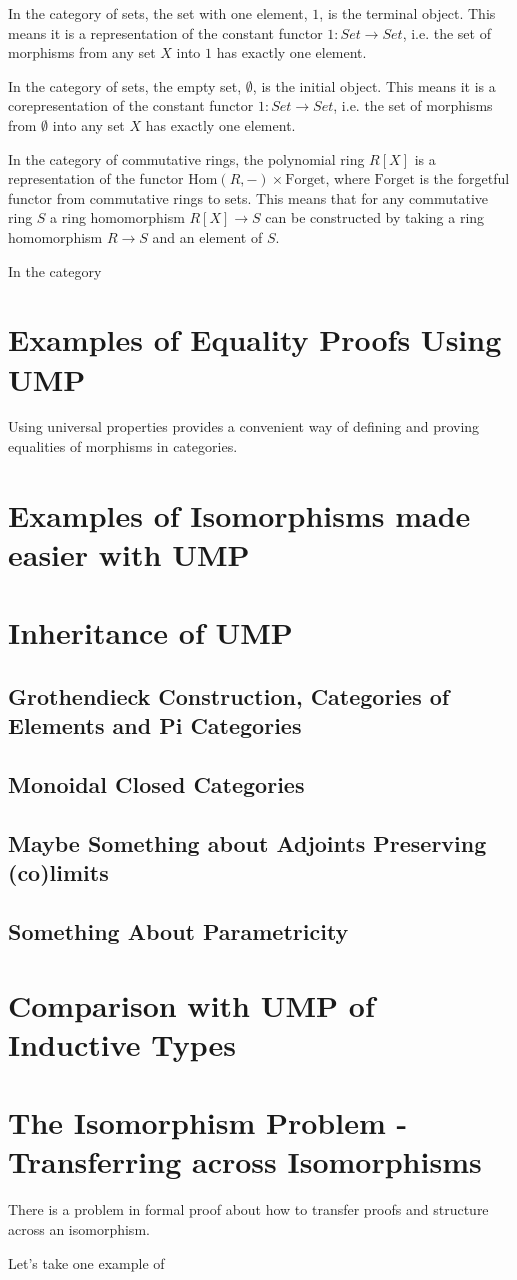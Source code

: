 \documentclass[12pt]{article} %
\theoremstyle{definition}
\theoremstyle{definition}
\theoremstyle{definition}
\theoremstyle{definition}
\begin{document}
In the category of sets, the set with one element, $1$, is the terminal object. This means it is a representation
of the constant functor $1 : Set \to Set$, i.e. the set of morphisms from any set $X$ into $1$ has exactly
one element.

In the category of sets, the empty set, $\emptyset$, is the initial object. This means it is a corepresentation
of the constant functor $1 : Set \to Set$, i.e. the set of morphisms from $\emptyset$ into any set $X$ has
exactly one element.

In the category of commutative rings, the polynomial ring $R[X]$ is a representation of the functor
$\text{Hom}(R, -) \times \text{Forget}$, where $\text{Forget}$ is the forgetful
functor from commutative rings to sets. This means that for any commutative ring $S$ a ring homomorphism
$R[X] \to S$ can be constructed by taking a ring homomorphism $R \to S$ and an element of $S$.

In the category


\section{Examples of Equality Proofs Using UMP}

Using universal properties provides a convenient way of defining and proving equalities of morphisms in
categories.

\section{Examples of Isomorphisms made easier with UMP}


\section{Inheritance of UMP}

\subsection{Grothendieck Construction, Categories of Elements and Pi Categories}

\subsection{Monoidal Closed Categories}

\subsection{Maybe Something about Adjoints Preserving (co)limits}

\subsection{Something About Parametricity}

\section{Comparison with UMP of Inductive Types}

\section{The Isomorphism Problem - Transferring across Isomorphisms}

There is a problem in formal proof about how to transfer proofs and structure across an isomorphism.

Let's take one example of
\end{document}
